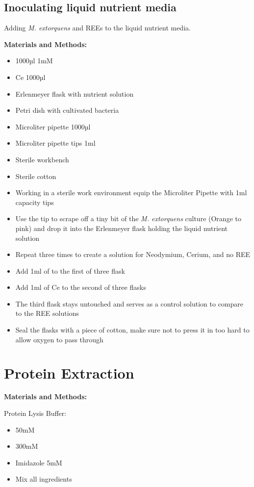 \subsection{Inoculating liquid nutrient media}
Adding \emph{M. extorquens} and REEs to the liquid nutrient media.

\textbf{Materials and Methods:}

\begin{itemize}
    \item {} 1000µl 1mM
    \item Ce 1000µl
    \item Erlenmeyer flask with nutrient solution
    \item Petri dish with cultivated bacteria
    \item Microliter pipette 1000µl
    \item Microliter pipette tips 1ml
    \item Sterile workbench
    \item Sterile cotton
    \item Working in a sterile work environment equip the Microliter Pipette with 1ml
    capacity tips
    \item Use the tip to scrape off a tiny bit of the \emph{M. extorquens} culture (Orange to
    pink) and drop it into the Erlenmeyer flask holding the liquid nutrient solution
    \item Repeat three times to create a solution for Neodymium, Cerium, and no REE
    \item Add 1ml of  to the first of three flask
    \item Add 1ml of Ce to the second of three flasks
    \item The third flask stays untouched and serves as a control solution to compare
    to the REE solutions
    \item Seal the flasks with a piece of cotton, make sure not to press it in too hard to
    allow oxygen to pass through
\end{itemize}

\newpage

\section{Protein Extraction\authorB}

\textbf{Materials and Methods:}

Protein Lysis Buffer:

\begin{itemize}
    \item {} 50mM
    \item {} 300mM
    \item Imidazole 5mM
    \item Mix all ingredients
\end{itemize}

